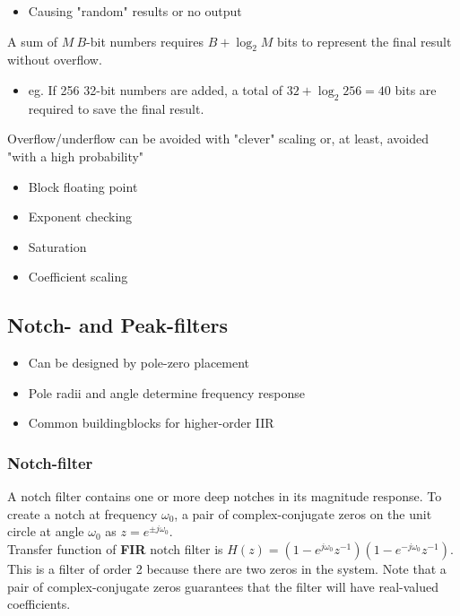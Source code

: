 \begin{itemize}
	\item Causing "random" results or no output
\end{itemize}

A sum of $M \: B$-bit numbers requires $B + \log_2 M$ bits to represent the final result without overflow.
\begin{itemize}
	\item eg. If 256 32-bit numbers	are added, a total of $32 + \log_2 256 =40$ bits are required to save the final result.
\end{itemize}

Overflow/underflow can be avoided with "clever" scaling or, at least, avoided "with a high probability"
\begin{itemize}
	\item Block floating point
	\item Exponent checking
	\item Saturation
	\item Coefficient scaling
\end{itemize}

\subsection{Notch- and Peak-filters}
\begin{itemize}
	\item Can be designed by pole-zero placement
	\item Pole radii and angle determine frequency response
	\item Common buildingblocks	for higher-order IIR
\end{itemize}

\subsubsection{Notch-filter}
A notch filter contains one or more deep notches in its magnitude response. To create a notch at frequency $\omega_0$, a pair of complex-conjugate zeros on
the unit circle at angle $\omega_0$ as $z=e^{\pm j\omega_0}$.\\

\noindent Transfer function of \textbf{FIR} notch filter is  $H(z) = (1-e^{j\omega_0} z^{-1})(1-e^{-j\omega_0} z^{-1})$. This is a filter of order 2 because there are two zeros in the system. Note that a pair of complex-conjugate zeros guarantees that the filter will have real-valued coefficients.\\


